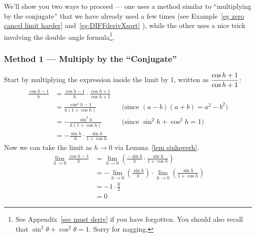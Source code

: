 We'll show you two ways to proceed --- one uses a method similar to ``multiplying by the
conjugate'' that we have already used a few times (see Example~\ref{eg zero cancel limit
harder} and~\ref{eg:DIFFderivXsqrt} ), while the other uses a nice trick involving
the double--angle formula\footnote{See Appendix~\ref{sec must deriv} if you have
forgotten. You should also recall that $\sin^2\theta + \cos^2\theta =
1$. Sorry for nagging.}.

\subsubsection{Method 1 --- Multiply by the ``Conjugate''}
Start by multiplying the expression inside the limit by 1, written as
$\displaystyle \frac{\cos h + 1}{\cos h +1}$:
\begin{align*}
  \frac{\cos h - 1}{h}
  &= \frac{\cos h - 1}{h} \cdot\frac{\cos h + 1}{\cos h +1}\\
  &= \frac{\cos^2 h - 1}{h (1+ \cos h)}
           &&\text{$\big($since $(a-b)(a+b)=a^2-b^2\big)$}\\
  &= -\frac{\sin^2 h}{h(1+\cos h)}
           &&\text{(since $\sin^2 h + \cos^2 h=1$)} \\
  &= - \frac{\sin h}{h} \cdot \frac{\sin h}{1 + \cos h}
\end{align*}
Now we can take the limit as $h \to 0$ via Lemma~\ref{lem sinhoverh}.
\begin{align*}
 \lim_{h \to 0} \frac{\cos h - 1}{h}
  &= \lim_{h \to 0} \left( \frac{-\sin h}{h} \cdot \frac{\sin h}{1 + \cos h}
\right)\\
  &= -\lim_{h \to 0}\left( \frac{\sin h}{h} \right) \cdot \lim_{h \to0}
\left( \frac{\sin h}{1 + \cos h} \right) \\
  &= - 1 \cdot \frac{0}{2} \\
  &= 0
\end{align*}

